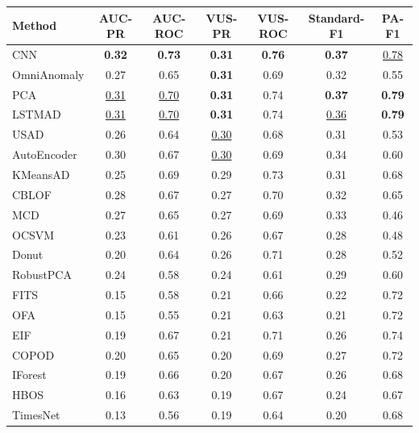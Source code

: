 \documentclass[border=2pt]{standalone}
\begin{document}
\renewcommand{\arraystretch}{1.05}
\setlength{\tabcolsep}{6pt}
\small

\begin{tabular}{l|cccccc}
\toprule
\textbf{Method} & \textbf{AUC-PR} & \textbf{AUC-ROC} & \textbf{VUS-PR} & \textbf{VUS-ROC} & \textbf{Standard-F1} & \textbf{PA-F1} \\
\midrule
CNN                    & \textbf{0.32} & \textbf{0.73} & \textbf{0.31} & \textbf{0.76} & \textbf{0.37} & \underline{0.78} \\
OmniAnomaly            & 0.27 & 0.65 & \textbf{0.31} & 0.69 & 0.32 & 0.55 \\
PCA                    & \underline{0.31} & \underline{0.70} & \textbf{0.31} & 0.74 & \textbf{0.37} & \textbf{0.79} \\
LSTMAD                 & \underline{0.31} & \underline{0.70} & \textbf{0.31} & 0.74 & \underline{0.36} & \textbf{0.79} \\
USAD                   & 0.26 & 0.64 & \underline{0.30} & 0.68 & 0.31 & 0.53 \\
AutoEncoder            & 0.30 & 0.67 & \underline{0.30} & 0.69 & 0.34 & 0.60 \\
KMeansAD               & 0.25 & 0.69 & 0.29 & 0.73 & 0.31 & 0.68 \\
CBLOF                  & 0.28 & 0.67 & 0.27 & 0.70 & 0.32 & 0.65 \\
MCD                    & 0.27 & 0.65 & 0.27 & 0.69 & 0.33 & 0.46 \\
OCSVM                  & 0.23 & 0.61 & 0.26 & 0.67 & 0.28 & 0.48 \\
Donut                  & 0.20 & 0.64 & 0.26 & 0.71 & 0.28 & 0.52 \\
RobustPCA              & 0.24 & 0.58 & 0.24 & 0.61 & 0.29 & 0.60 \\
FITS                   & 0.15 & 0.58 & 0.21 & 0.66 & 0.22 & 0.72 \\
OFA                    & 0.15 & 0.55 & 0.21 & 0.63 & 0.21 & 0.72 \\
EIF                    & 0.19 & 0.67 & 0.21 & 0.71 & 0.26 & 0.74 \\
COPOD                  & 0.20 & 0.65 & 0.20 & 0.69 & 0.27 & 0.72 \\
IForest                & 0.19 & 0.66 & 0.20 & 0.67 & 0.26 & 0.68 \\
HBOS                   & 0.16 & 0.63 & 0.19 & 0.67 & 0.24 & 0.67 \\
TimesNet               & 0.13 & 0.56 & 0.19 & 0.64 & 0.20 & 0.68 \\

\end{tabular}
\end{document}
